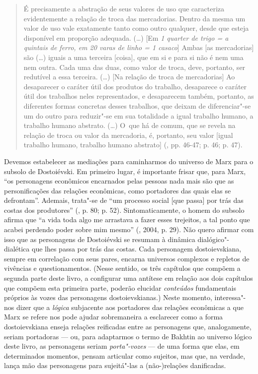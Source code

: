 \begin{quote}
É precisamente a abstração de seus valores de uso que caracteriza
evidentemente a relação de troca das mercadorias. Dentro da mesma um
valor de uso vale exatamente tanto como outro qualquer, desde que esteja
disponível em proporção adequada. (\ldots) {[}Em \emph{1 quarter de trigo =
a quintais de ferro, em 20 varas de linho = 1 casaco}{]} Ambas {[}as
mercadorias{]} são (\ldots) iguais a uma terceira {[}coisa{]}, que em si e
para si não é nem uma nem outra. Cada uma das duas, como valor de troca,
deve, portanto, ser redutível a essa terceira. (\ldots) {[}Na relação de
troca de mercadorias{]} Ao desaparecer o caráter útil dos produtos do
trabalho, desaparece o caráter útil dos trabalhos neles representados, e
desaparecem também, portanto, as diferentes formas concretas desses
trabalhos, que deixam de diferenciar"-se um do outro para reduzir"-se em
sua totalidade a igual trabalho humano, a trabalho humano abstrato.
(\ldots) O~que há de comum, que se revela na relação de troca ou valor da
mercadoria, é, portanto, seu valor {[}igual trabalho humano, trabalho
humano abstrato{]} (, pp. 46-47; p. 46; p. 47).
\end{quote}

Devemos estabelecer as mediações para caminharmos do universo de Marx
para o subsolo de Dostoiévski. Em primeiro lugar, é importante frisar
que, para Marx, ``os personagens econômicos encarnados pelas pessoas
nada mais são que as personificações das relações econômicas, como
portadores das quais elas se defrontam''. Ademais, trata"-se de ``um
processo social {[}que passa{]} por trás das costas dos produtores''
(, p. 80; p. 52). Sintomaticamente, o homem do subsolo afirma que
``a vida toda algo me arrastava a fazer esses trejeitos, a tal ponto que
acabei perdendo poder sobre mim mesmo'' (, 2004, p. 29). Não
quero afirmar com isso que as personagens de Dostoiévski se resumam à
dinâmica dialógico"-dialética que lhes passa por trás das costas. Cada
personagem dostoievskiana, sempre em correlação com seus pares, encarna
universos complexos e repletos de vivências e questionamentos. (Nesse
sentido, os três capítulos que compõem a segunda parte deste livro, a
configurar uma antítese em relação aos dois capítulos que compõem esta
primeira parte, poderão elucidar \emph{conteúdos} fundamentais próprios
às vozes das personagens dostoievskianas.) Neste momento, interessa"-nos
dizer que a \emph{lógica} subjacente aos portadores das relações
econômicas a que Marx se refere nos pode ajudar sobremaneira a
esclarecer como a forma dostoievskiana enseja relações reificadas entre
as personagens que, analogamente, seriam portadoras --- ou, para
adaptarmos o termo de Bakhtin ao universo lógico deste livro, as
personagens seriam \emph{porta"-vozes} --- de uma forma que elas, em
determinados momentos, pensam articular como sujeitos, mas que, na
verdade, lança mão das personagens para sujeitá"-las a \mbox{(não-)relações}
danificadas.

